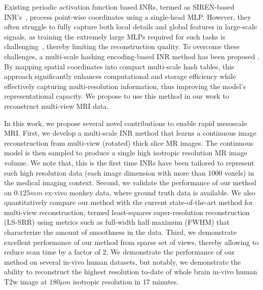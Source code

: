 \documentclass[AMA,STIX2COL]{MRM}
\begin{document}
Existing periodic activation function based INRs, termed as SIREN-based INR's~\cite{sitzmann2020implicit}, process point-wise coordinates using a single-head MLP. However, they often struggle to fully capture both local details and global features in large-scale signals, as training the extremely large MLPs required for such tasks is challenging~\cite{xie2022neural}, thereby limiting the reconstruction quality. To overcome these challenges, a multi-scale hashing encoding-based INR method has been proposed \cite{muller2022instant, dwedari2024estimating}. By mapping spatial coordinates into compact multi-scale hash tables, this approach significantly enhances computational and storage efficiency while effectively capturing multi-resolution information, thus improving the model’s representational capacity. We propose to use this method in our work to reconstruct multi-view MRI data. 

In this work, we propose several novel contributions to enable rapid mesoscale MRI. First, we develop a multi-scale INR method that learns a continuous image reconstruction from multi-view (rotated) thick slice MR images. The continuous model is then sampled to produce a single high isotropic resolution MR image volume. 
We note that, this is the first time INRs have been tailored to represent such high resolution data (each image dimension with more than 1000 voxels) in the medical imaging context. Second, we validate the performance of our method on $0.125 mm$ ex-vivo monkey data, where ground truth data is available. We also quantitatively compare our method with the current state-of-the-art method for multi-view reconstruction, termed least-squares super-resolution reconstruction (LS-SRR)\cite{vis2021accuracy, dong2024romer} using metrics such as full-width half maximum (FWHM)\cite{manzano2024denoising}  that characterize the amount of smoothness in the data. Third, we demonstrate excellent performance of our method from sparse set of views, thereby allowing to reduce scan time by a factor of 2. We demonstrate the performance of our method on several in-vivo human datasets, but notably, we demonstrate the ability to reconstruct the highest resolution to-date of whole brain in-vivo human T2w image at $180 \mu m$ isotropic resolution in 17 minutes. %
\end{document}
